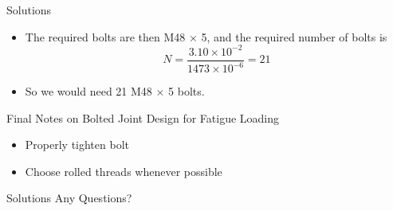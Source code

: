 \documentclass[10pt, svgnames]{beamer}
\begin{document}
\begin{frame}[label={sec:org0e9cc78}]{Solutions}
\begin{itemize}
  \item The required bolts are then M48 $\times$ 5, and the required number of bolts is
        \[N = \frac{{3.10 \times {{10}^{ - 2}}}}{{1473 \times {{10}^{ - 6}}}} = 21\]
  \item So we would need 21 M48 $\times$ 5 bolts.
\end{itemize}
\end{frame}

\begin{frame}[label={sec:org2ea3706}]{Final Notes on Bolted Joint Design for Fatigue Loading}
\begin{itemize}
\item Properly tighten bolt
\item Choose rolled threads whenever possible
\end{itemize}
\end{frame}

\begin{frame}[label={sec:orgbfbcfac}]{Solutions}
\Huge \centering Any Questions?
\end{frame}
\end{document}
